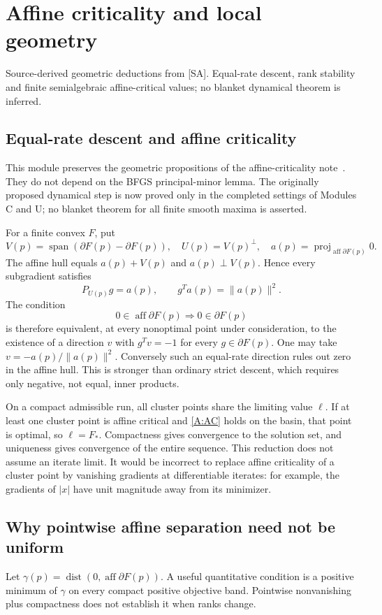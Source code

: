 \documentclass[10pt,oneside,openany]{book}
\newcommand{\ModuleTag}{I}
\theoremstyle{remark}\newtheorem{remark}{Remark}[chapter]
\newcommand{\StartModule}[3]{\cleardoublepage\renewcommand{\ModuleTag}{#1}\chapter{#2}\label{#1:chapter}\begin{small}\color{Accent}#3\end{small}\par\vspace{3pt}{\color{RuleGray}\hrule}\vspace{9pt}}
\begin{document}
\endgroup


\StartModule{A}{Affine criticality and local geometry}{Source-derived geometric deductions from [SA]. Equal-rate descent, rank stability and finite semialgebraic affine-critical values; no blanket dynamical theorem is inferred.}

\section{Equal-rate descent and affine criticality}
This module preserves the geometric propositions of the affine-criticality note~\cite{SA}. They do not depend on the BFGS principal-minor lemma. The originally proposed dynamical step is now proved only in the completed settings of Modules C and U; no blanket theorem for all finite smooth maxima is asserted.

For a finite convex $F$, put
\[
 V(p)=\operatorname{span}(\partial F(p)-\partial F(p)),\quad U(p)=V(p)^\perp,
 \quad a(p)=\operatorname{proj}_{\operatorname{aff}\partial F(p)}0.
\]
The affine hull equals $a(p)+V(p)$ and $a(p)\perp V(p)$. Hence every subgradient satisfies
\[
 P_{U(p)}g=a(p),\qquad g^Ta(p)=\|a(p)\|^2.
\]
The condition
\begin{equation}\label{A:AC}
 0\in\operatorname{aff}\partial F(p)\Longrightarrow0\in\partial F(p)
\end{equation}
is therefore equivalent, at every nonoptimal point under consideration, to the existence of a direction $v$ with $g^Tv=-1$ for every $g\in\partial F(p)$. One may take $v=-a(p)/\|a(p)\|^2$. Conversely such an equal-rate direction rules out zero in the affine hull. This is stronger than ordinary strict descent, which requires only negative, not equal, inner products.

On a compact admissible run, all cluster points share the limiting value $\ell$. If at least one cluster point is affine critical and \eqref{A:AC} holds on the basin, that point is optimal, so $\ell=F_*$. Compactness gives convergence to the solution set, and uniqueness gives convergence of the entire sequence. This reduction does not assume an iterate limit. It would be incorrect to replace affine criticality of a cluster point by vanishing gradients at differentiable iterates: for example, the gradients of $|x|$ have unit magnitude away from its minimizer.

\section{Why pointwise affine separation need not be uniform}
Let $\gamma(p)=\operatorname{dist}(0,\operatorname{aff}\partial F(p))$. A useful quantitative condition is a positive minimum of $\gamma$ on every compact positive objective band. Pointwise nonvanishing plus compactness does not establish it when ranks change.
\end{document}
